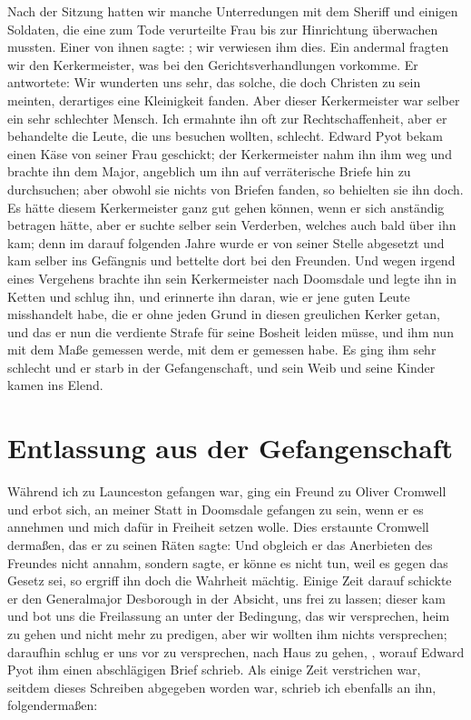 Nach der Sitzung hatten wir manche Unterredungen mit dem
Sheriff und einigen Soldaten, die eine zum Tode verurteilte Frau
bis zur Hinrichtung überwachen mussten. Einer von ihnen sagte:
; wir
verwiesen ihm dies. Ein andermal fragten wir den Kerkermeister,
was bei den Gerichtsverhandlungen vorkomme. Er antwortete:
 Wir wunderten uns sehr, das solche, die doch
Christen zu sein meinten, derartiges eine Kleinigkeit fanden.
Aber dieser Kerkermeister war selber ein sehr schlechter Mensch.
Ich ermahnte ihn oft zur Rechtschaffenheit, aber er behandelte
die Leute, die uns besuchen wollten, schlecht. 
Edward Pyot bekam
einen Käse von seiner Frau geschickt; der Kerkermeister nahm ihn
ihm weg und brachte ihn dem Major, angeblich um ihn auf
verräterische Briefe hin zu durchsuchen; aber obwohl sie nichts
von Briefen fanden, so behielten sie ihn doch. Es hätte diesem
Kerkermeister ganz gut gehen können, wenn er sich anständig
betragen hätte, aber er suchte selber sein Verderben, welches auch
bald über ihn kam; denn im darauf folgenden Jahre wurde er
von seiner Stelle abgesetzt und kam selber ins Gefängnis und
bettelte dort bei den Freunden. Und wegen irgend eines 
Vergehens brachte ihn sein Kerkermeister nach Doomsdale und legte
ihn in Ketten und schlug ihn, und erinnerte ihn daran, wie er
jene guten Leute misshandelt habe, die er ohne jeden Grund in
diesen greulichen Kerker getan, und das er nun die verdiente
Strafe für seine Bosheit leiden müsse, und ihm nun mit dem
Maße gemessen werde, mit dem er gemessen habe. Es ging ihm
sehr schlecht und er starb in der Gefangenschaft, und sein Weib
und seine Kinder kamen ins Elend.

\section{Entlassung aus der Gefangenschaft}
Während ich zu Launceston gefangen war, ging ein Freund
zu Oliver Cromwell und erbot 
sich, an meiner Statt in 
Doomsdale gefangen zu sein, wenn er es annehmen und mich dafür
in Freiheit setzen wolle. Dies erstaunte Cromwell dermaßen,
das er zu seinen Räten sagte:  Und obgleich er
das Anerbieten des Freundes nicht annahm, sondern sagte, er
könne es nicht tun, weil es gegen das Gesetz sei, so ergriff ihn
doch die Wahrheit mächtig. Einige Zeit darauf schickte er den
Generalmajor Desborough 
in der Absicht, uns frei zu lassen;
dieser kam und bot uns die Freilassung an unter der Bedingung,
das wir versprechen, heim zu gehen und nicht mehr zu predigen,
aber wir wollten ihm nichts versprechen; daraufhin schlug er uns
vor zu versprechen, nach Haus zu gehen, , worauf Edward Pyot ihm 
einen abschlägigen Brief schrieb.
Als einige Zeit verstrichen war, seitdem dieses Schreiben
abgegeben worden war, schrieb ich ebenfalls an ihn, 
folgendermaßen:

